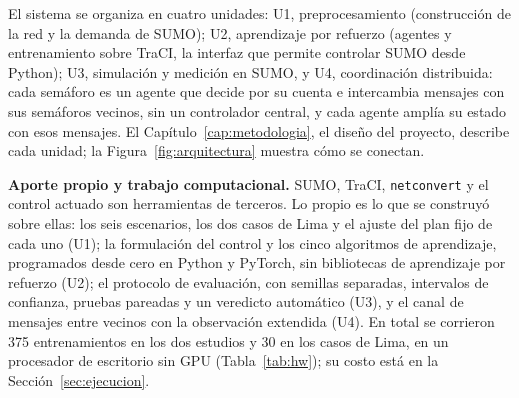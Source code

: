 
El sistema se organiza en cuatro unidades: U1, preprocesamiento (construcción de la red y la demanda de SUMO); U2, aprendizaje por refuerzo (agentes y entrenamiento sobre TraCI, la interfaz que permite controlar SUMO desde Python); U3, simulación y medición en SUMO, y U4, coordinación distribuida: cada semáforo es un agente que decide por su cuenta e intercambia mensajes con sus semáforos vecinos, sin un controlador central, y cada agente amplía su estado con esos mensajes. El Capítulo~\ref{cap:metodologia}, el diseño del proyecto, describe cada unidad; la Figura~\ref{fig:arquitectura} muestra cómo se conectan.

\textbf{Aporte propio y trabajo computacional.} SUMO, TraCI, \texttt{netconvert} y el control actuado son herramientas de terceros. Lo propio es lo que se construyó sobre ellas: los seis escenarios, los dos casos de Lima y el ajuste del plan fijo de cada uno (U1); la formulación del control y los cinco algoritmos de aprendizaje, programados desde cero en Python y PyTorch, sin bibliotecas de aprendizaje por refuerzo (U2); el protocolo de evaluación, con semillas separadas, intervalos de confianza, pruebas pareadas y un veredicto automático (U3), y el canal de mensajes entre vecinos con la observación extendida (U4). En total se corrieron 375 entrenamientos en los dos estudios y 30 en los casos de Lima, en un procesador de escritorio sin GPU (Tabla~\ref{tab:hw}); su costo está en la Sección~\ref{sec:ejecucion}.

